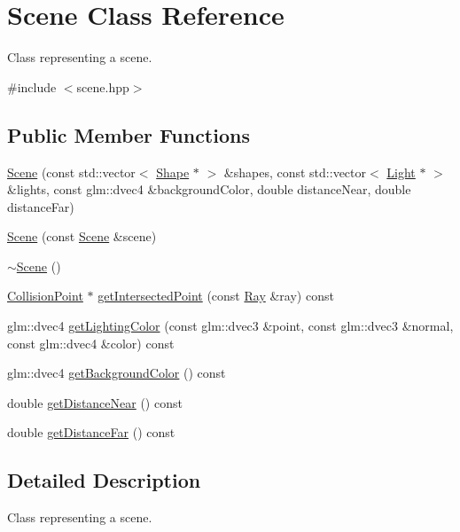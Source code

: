 \hypertarget{class_scene}{}\section{Scene Class Reference}
\label{class_scene}


Class representing a scene.  




{\ttfamily \#include $<$scene.\+hpp$>$}

\subsection*{Public Member Functions}
\begin{DoxyCompactItemize}
\item 
\hyperlink{class_scene_a6b52f72ea591204f451087b9792da171}{Scene} (const std\+::vector$<$ \hyperlink{class_shape}{Shape} $\ast$ $>$ \&shapes, const std\+::vector$<$ \hyperlink{class_light}{Light} $\ast$ $>$ \&lights, const glm\+::dvec4 \&background\+Color, double distance\+Near, double distance\+Far)
\item 
\hyperlink{class_scene_aae99632f6bac1360a8c7463c9ab0f613}{Scene} (const \hyperlink{class_scene}{Scene} \&scene)
\item 
\hyperlink{class_scene_a3b8cec2e32546713915f8c6303c951f1}{$\sim$\+Scene} ()
\item 
\hyperlink{class_collision_point}{Collision\+Point} $\ast$ \hyperlink{class_scene_aab56ec23d1fa987c7df17314c2a66e2e}{get\+Intersected\+Point} (const \hyperlink{class_ray}{Ray} \&ray) const 
\item 
glm\+::dvec4 \hyperlink{class_scene_a376dbe1ad119c38af20d56c21ab0c1ff}{get\+Lighting\+Color} (const glm\+::dvec3 \&point, const glm\+::dvec3 \&normal, const glm\+::dvec4 \&color) const 
\item 
glm\+::dvec4 \hyperlink{class_scene_ac4fd39d19429fce38bca6e3aeed1a9be}{get\+Background\+Color} () const 
\item 
double \hyperlink{class_scene_aec72df7b7e2e63665f8f60eed4472ddc}{get\+Distance\+Near} () const 
\item 
double \hyperlink{class_scene_a41e924d1668f1ab449c557eb36701ea5}{get\+Distance\+Far} () const 
\end{DoxyCompactItemize}


\subsection{Detailed Description}
Class representing a scene. 

